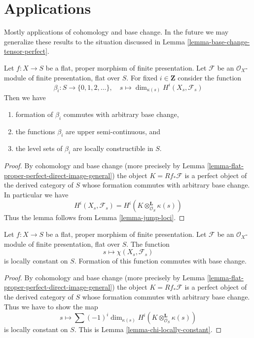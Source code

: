 \section{Applications}
\label{section-applications}

\noindent
Mostly applications of cohomology and base change. In the future we may
generalize these results to the situation discussed in
Lemma \ref{lemma-base-change-tensor-perfect}.

\begin{lemma}
\label{lemma-jump-loci-geometric}
Let $f : X \to S$ be a flat, proper morphism of finite presentation.
Let $\mathcal{F}$ be an $\mathcal{O}_X$-module of finite presentation,
flat over $S$. For fixed $i \in \mathbf{Z}$ consider the function
$$
\beta_i : S \to \{0, 1, 2, \ldots\},\quad
s \longmapsto \dim_{\kappa(s)} H^i(X_s, \mathcal{F}_s)
$$
Then we have
\begin{enumerate}
\item formation of $\beta_i$ commutes with arbitrary base change,
\item the functions $\beta_i$ are upper semi-continuous, and
\item the level sets of $\beta_i$ are locally constructible in $S$.
\end{enumerate}
\end{lemma}

\begin{proof}
By cohomology and base change (more precisely by
Lemma \ref{lemma-flat-proper-perfect-direct-image-general})
the object $K = Rf_*\mathcal{F}$ is a perfect object of the derived
category of $S$ whose formation commutes with arbitrary base change.
In particular we have
$$
H^i(X_s, \mathcal{F}_s) = H^i(K \otimes_{\mathcal{O}_S}^\mathbf{L} \kappa(s))
$$
Thus the lemma follows from
Lemma \ref{lemma-jump-loci}.
\end{proof}

\begin{lemma}
\label{lemma-chi-locally-constant-geometric}
Let $f : X \to S$ be a flat, proper morphism of finite presentation.
Let $\mathcal{F}$ be an $\mathcal{O}_X$-module of finite presentation,
flat over $S$. The function
$$
s \longmapsto \chi(X_s, \mathcal{F}_s)
$$
is locally constant on $S$. Formation of this function commutes with
base change.
\end{lemma}

\begin{proof}
By cohomology and base change (more precisely by
Lemma \ref{lemma-flat-proper-perfect-direct-image-general})
the object $K = Rf_*\mathcal{F}$ is a perfect object of the derived
category of $S$ whose formation commutes with arbitrary base change.
Thus we have to show the map
$$
s \longmapsto \sum (-1)^i \dim_{\kappa(s)}
H^i(K \otimes^\mathbf{L}_{\mathcal{O}_S} \kappa(s))
$$
is locally constant on $S$. This is Lemma \ref{lemma-chi-locally-constant}.
\end{proof}

